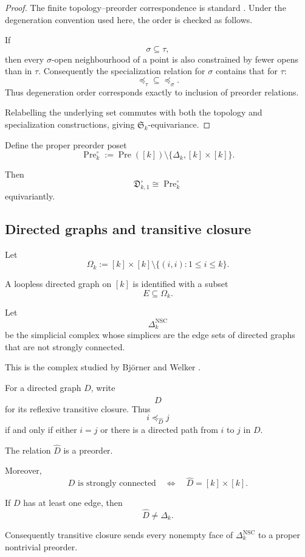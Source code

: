 \documentclass[11pt]{article}
\theoremstyle{plain}
\theoremstyle{definition}
\begin{document}
\begin{proof}
The finite topology--preorder correspondence is standard \citep{Alexandroff1937,Stong1966,Barmak2011}.  Under the degeneration convention used here, the order is checked as follows.

If
\[
\sigma\subseteq\tau,
\]
then every $\sigma$-open neighbourhood of a point is also constrained by
fewer opens than in $\tau$.  Consequently the specialization relation
for $\sigma$ contains that for $\tau$:
\[
\preceq_\tau
\subseteq
\preceq_\sigma.
\]
Thus degeneration order corresponds exactly to inclusion of preorder
relations.

Relabelling the underlying set commutes with both the topology and
specialization constructions, giving $\mathfrak S_k$-equivariance.
\end{proof}

Define the proper preorder poset
\[
\operatorname{Pre}_k^\circ
:=
\operatorname{Pre}([k])
\setminus
\{\Delta_k,[k]\times[k]\}.
\]

Then
\[
\mathfrak D_{k,1}^{\circ}
\cong
\operatorname{Pre}_k^\circ
\]
equivariantly.

\subsection{Directed graphs and transitive closure}
\label{subsec:preorders-directed-graphs}

Let
\[
\Omega_k
:=
[k]\times[k]
\setminus
\{(i,i):1\leq i\leq k\}.
\]

A loopless directed graph on $[k]$ is identified with a subset
\[
E\subseteq\Omega_k.
\]

Let
\[
\Delta_k^{\mathrm{NSC}}
\]
be the simplicial complex whose simplices are the edge sets of directed
graphs that are not strongly connected.

This is the complex studied by Bj\"orner and Welker
\citep{BjornerWelker1999}.

For a directed graph $D$, write
\[
\widehat D
\]
for its reflexive transitive closure.  Thus
\[
i\preceq_{\widehat D}j
\]
if and only if either $i=j$ or there is a directed path from $i$ to $j$
in $D$.

The relation $\widehat D$ is a preorder.

Moreover,
\[
D\text{ is strongly connected}
\quad\Longleftrightarrow\quad
\widehat D=[k]\times[k].
\]

If $D$ has at least one edge, then
\[
\widehat D\neq\Delta_k.
\]

Consequently transitive closure sends every nonempty face of
$\Delta_k^{\mathrm{NSC}}$ to a proper nontrivial preorder.
\end{document}
